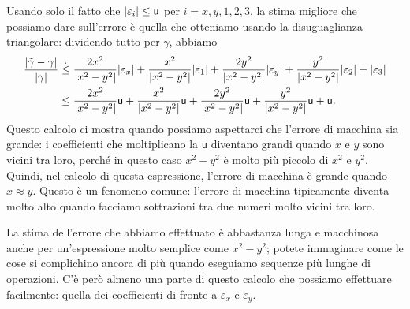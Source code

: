 \documentclass[a4paper]{report}
\DeclarePairedDelimiter{\abs}{\lvert}{\rvert}
\theoremstyle{definiton}
\theoremstyle{remark}
\begin{document}
Usando solo il fatto che $\abs{\varepsilon_i} \leq \mathsf{u}$ per $i=x,y,1,2,3$, la stima migliore che possiamo dare sull'errore è quella che otteniamo usando la disuguaglianza triangolare: dividendo tutto per $\gamma$, abbiamo
\begin{align}
    \frac{\abs{\tilde{\gamma}-\gamma}}{\abs{\gamma}} &\stackrel{.}{\leq} \frac{2x^2}{\abs{x^2-y^2}} \abs{\varepsilon_x} + \frac{x^2}{\abs{x^2-y^2}}\abs{\varepsilon_1} + \frac{2y^2}{\abs{x^2-y^2}} \abs{\varepsilon_y} + \frac{y^2}{\abs{x^2-y^2}} \abs{\varepsilon_2} + \abs{\varepsilon_3} \nonumber\\
    &\leq \frac{2x^2}{\abs{x^2-y^2}} \mathsf{u} + \frac{x^2}{\abs{x^2-y^2}} \mathsf{u} + \frac{2y^2}{\abs{x^2-y^2}} \mathsf{u} + \frac{y^2}{\abs{x^2-y^2}} \mathsf{u} + \mathsf{u}. \label{esempiox2y2}
\end{align}
Questo calcolo ci mostra quando possiamo aspettarci che l'errore di macchina sia grande: i coefficienti che moltiplicano la $\mathsf{u}$ diventano grandi quando $x$ e $y$ sono vicini tra loro, perché in questo caso $x^2-y^2$ è molto più piccolo di $x^2$ e $y^2$. Quindi, nel calcolo di questa espressione, l'errore di macchina è grande quando $x\approx y$. Questo è un fenomeno comune: l'errore di macchina tipicamente diventa molto alto quando facciamo sottrazioni tra due numeri molto vicini tra loro.

La stima dell'errore che abbiamo effettuato è abbastanza lunga e macchinosa anche per un'espressione molto semplice come $x^2-y^2$; potete immaginare come le cose si complichino ancora di più quando eseguiamo sequenze più lunghe di operazioni. C'è però almeno una parte di questo calcolo che possiamo effettuare facilmente: quella dei coefficienti di fronte a $\varepsilon_x$ e $\varepsilon_y$.
\end{document}
